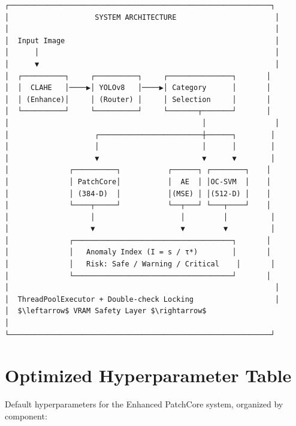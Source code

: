 \documentclass[12pt, a4paper, oneside]{report}
\begin{document}
\begin{lstlisting}
┌─────────────────────────────────────────────────────────────┐
│                    SYSTEM ARCHITECTURE                       │
│                                                              │
│  Input Image                                                 │
│      │                                                       │
│      ▼                                                       │
│  ┌──────────┐     ┌──────────┐     ┌───────────────┐       │
│  │  CLAHE   │────▶│ YOLOv8   │────▶│ Category      │       │
│  │ (Enhance)│     │ (Router) │     │ Selection     │       │
│  └──────────┘     └──────────┘     └───────┬───────┘       │
│                                             │                │
│                    ┌────────────────────────┼──────┐        │
│                    │                        │      │        │
│                    ▼                        ▼      ▼        │
│              ┌──────────┐           ┌──────┐ ┌────────┐    │
│              │ PatchCore│           │  AE  │ │OC-SVM  │    │
│              │ (384-D)  │           │(MSE) │ │(512-D) │    │
│              └────┬─────┘           └──┬───┘ └───┬────┘    │
│                   │                    │         │          │
│                   ▼                    ▼         ▼          │
│              ┌─────────────────────────────────────┐       │
│              │   Anomaly Index (I = s / τ*)        │       │
│              │   Risk: Safe / Warning / Critical    │       │
│              └─────────────────────────────────────┘       │
│                                                              │
│  ThreadPoolExecutor + Double-check Locking                   │
│  $\leftarrow$ VRAM Safety Layer $\rightarrow$                                       │
└─────────────────────────────────────────────────────────────┘
\end{lstlisting}

\bigskip\noindent\hrulefill\bigskip

\section{\1 Optimized Hyperparameter Table}\label{appendix-b-optimized-hyperparameter-table}

Default hyperparameters for the Enhanced PatchCore system, organized by component:
\end{document}
